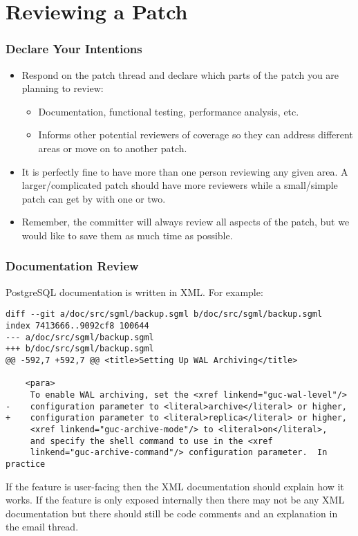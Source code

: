 \section{Reviewing a Patch}

\begin{frame}
    \frametitle{Declare Your Intentions}

    \begin{itemize}
        \item Respond on the patch thread and declare which parts of the patch you are planning to review:

        \begin{itemize}
            \item Documentation, functional testing, performance analysis, etc.\pause
            \item Informs other potential reviewers of coverage so they can address different areas or move on to another patch.\pause
        \end{itemize}

        \item It is perfectly fine to have more than one person reviewing any given area.  A larger/complicated patch should have more reviewers while a small/simple patch can get by with one or two.\pause

        \item Remember, the committer will always review all aspects of the patch, but we would like to save them as much time as possible.
    \end{itemize}
\end{frame}

\begin{frame}[fragile]
    \frametitle{Documentation Review}

    PostgreSQL documentation is written in XML. For example:
    \vspace{1em}

    \begin{lstlisting}
diff --git a/doc/src/sgml/backup.sgml b/doc/src/sgml/backup.sgml
index 7413666..9092cf8 100644
--- a/doc/src/sgml/backup.sgml
+++ b/doc/src/sgml/backup.sgml
@@ -592,7 +592,7 @@ <title>Setting Up WAL Archiving</title>

    <para>
     To enable WAL archiving, set the <xref linkend="guc-wal-level"/>
-    configuration parameter to <literal>archive</literal> or higher,
+    configuration parameter to <literal>replica</literal> or higher,
     <xref linkend="guc-archive-mode"/> to <literal>on</literal>,
     and specify the shell command to use in the <xref
     linkend="guc-archive-command"/> configuration parameter.  In practice
    \end{lstlisting}
    \vspace{1em}
    If the feature is user-facing then the XML documentation should explain how it works.  If the feature is only exposed internally then there may not be any XML documentation but there should still be code comments and an explanation in the email thread.
\end{frame}

